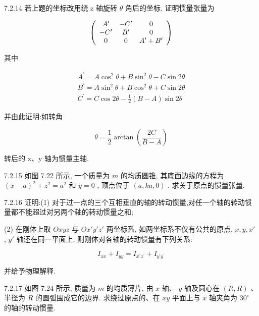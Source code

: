 \begin{problem}{7.2.14}
若上题的坐标改用绕 z 轴旋转 $\theta$ 角后的坐标, 证明惯量张量为

\[
\left( \begin{array}{c c c} A ^ {\prime} & - C ^ {\prime} & 0 \\ - C ^ {\prime} & B ^ {\prime} & 0 \\ 0 & 0 & A ^ {\prime} + B ^ {\prime} \end{array} \right)
\]

其中

\[
\begin{array}{l} {A ^ {\prime} = A \cos^ {2}   \theta + B \sin^ {2}   \theta - C \sin 2 \theta} \\ {B ^ {\prime} = A \sin^ {2}   \theta + B \cos^ {2}   \theta + C \sin 2 \theta} \\ {C ^ {\prime} = C \cos 2 \theta - \frac {1}{2} (B - A) \sin 2 \theta} \end{array}
\]

并由此证明:如转角

\[
\theta = \frac {1}{2} \arctan \left(\frac {2 C}{B - A}\right)
\]

转后的 x、y 轴为惯量主轴.
\end{problem}
\clearpage


\begin{problem}{7.2.15}
如图 7.22 所示, 一个质量为 $m$ 的均质圆锥, 其底面边缘的方程为 $(x - a)^2 + z^2 = a^2$ 和 $y = 0$ , 顶点位于 $(a, ka, 0)$ . 求关于原点的惯量张量.
\begin{center}

\end{center}
\end{problem}
\clearpage


\begin{problem}{7.2.16}
证明:(1) 对于过一点的三个互相垂直的轴的转动惯量,对任一个轴的转动惯量都不能超过对另两个轴的转动惯量之和;

(2) 在刚体上取 $Oxyz$ 与 $Ox'y'z'$ 两坐标系, 如两坐标系不仅有公共的原点, $x, y, x'$ , $y'$ 轴还在同一平面上, 则刚体对各轴的转动惯量有下列关系:

\[
I _ {x x} + I _ {y y} = I _ {x ^ {\prime} x ^ {\prime}} + I _ {y ^ {\prime} y ^ {\prime}}
\]

并给予物理解释.
\end{problem}
\clearpage


\begin{problem}{7.2.17}
如图 7.24 所示, 质量为 $m$ 的均质薄片, 由 $x$ 轴、 $y$ 轴及圆心在 $(R, R)$ 、半径为 $R$ 的圆弧围成它的边界. 求绕过原点的、在 $xy$ 平面上与 $x$ 轴夹角为 $30^\circ$ 的轴的转动惯量.
\begin{center}

\end{center}
\end{problem}
\clearpage


